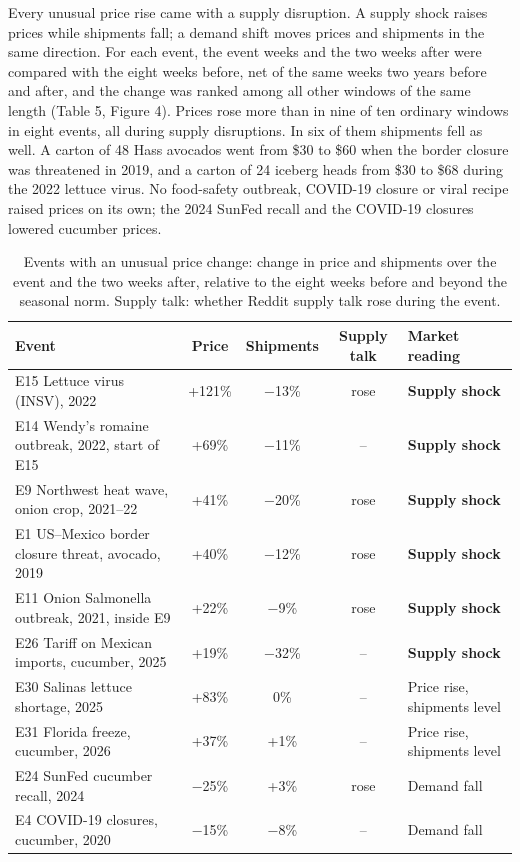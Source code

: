 \documentclass[
  11pt,
]{article}
\begin{document}
Every unusual price rise came with a supply disruption. A supply shock
raises prices while shipments fall; a demand shift moves prices and
shipments in the same direction. For each event, the event weeks and
the two weeks after were compared with the eight weeks before, net of the
same weeks two years before and after, and the change was ranked among
all other windows of the same length (Table 5, Figure 4). Prices rose more
than in nine of ten ordinary windows in eight events, all during supply
disruptions. In six of them shipments fell as well. A carton of 48 Hass
avocados went from \$30 to \$60 when the border closure was threatened in
2019, and a carton of 24 iceberg heads from \$30 to \$68 during the 2022
lettuce virus. No food-safety outbreak, COVID-19 closure or viral recipe
raised prices on its own; the 2024 SunFed recall and the COVID-19
closures lowered cucumber prices.

\begin{table}[htbp]
\centering\small
\caption{Events with an unusual price change: change in price and shipments over the event and the two weeks after, relative to the eight weeks before and beyond the seasonal norm. Supply talk: whether Reddit supply talk rose during the event.}
\begin{tabularx}{\linewidth}{>{\RaggedRight\arraybackslash}Xcccl}
\toprule
Event & Price & Shipments & Supply talk & Market reading \\
\midrule
E15 Lettuce virus (INSV), 2022 & +121\% & −13\% & rose & \textbf{Supply shock} \\
E14 Wendy's romaine outbreak, 2022, start of E15 & +69\% & −11\% & -- & \textbf{Supply shock} \\
E9 Northwest heat wave, onion crop, 2021--22 & +41\% & −20\% & rose & \textbf{Supply shock} \\
E1 US--Mexico border closure threat, avocado, 2019 & +40\% & −12\% & rose & \textbf{Supply shock} \\
E11 Onion Salmonella outbreak, 2021, inside E9 & +22\% & −9\% & rose & \textbf{Supply shock} \\
E26 Tariff on Mexican imports, cucumber, 2025 & +19\% & −32\% & -- & \textbf{Supply shock} \\
E30 Salinas lettuce shortage, 2025 & +83\% & 0\% & -- & Price rise, shipments level \\
E31 Florida freeze, cucumber, 2026 & +37\% & +1\% & -- & Price rise, shipments level \\
E24 SunFed cucumber recall, 2024 & −25\% & +3\% & rose & Demand fall \\
E4 COVID-19 closures, cucumber, 2020 & −15\% & −8\% & -- & Demand fall \\
\bottomrule
\end{tabularx}
\end{table}
\end{document}
